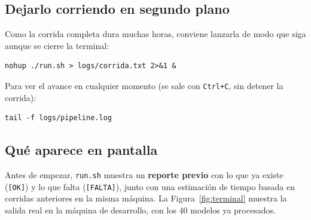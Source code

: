 \documentclass[11pt,a4paper]{article}
\begin{document}
\subsection{Dejarlo corriendo en segundo plano}

Como la corrida completa dura muchas horas, conviene lanzarla de modo que siga aunque se cierre la terminal:
\begin{lstlisting}
nohup ./run.sh > logs/corrida.txt 2>&1 &
\end{lstlisting}
Para ver el avance en cualquier momento (se sale con \texttt{Ctrl+C}, sin detener la corrida):
\begin{lstlisting}
tail -f logs/pipeline.log
\end{lstlisting}

\subsection{Qué aparece en pantalla}

Antes de empezar, \texttt{run.sh} muestra un \textbf{reporte previo} con lo que ya existe (\texttt{[OK]}) y lo que falta (\texttt{[FALTA]}), junto con una estimación de tiempo basada en corridas anteriores en la misma máquina. La Figura~\ref{fig:terminal} muestra la salida real en la máquina de desarrollo, con los 40 modelos ya procesados.
\end{document}
